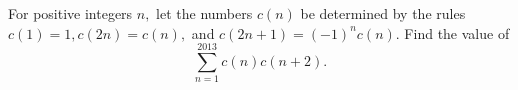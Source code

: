 For positive integers $n,$ let the numbers $c(n)$ be determined by the rules $c(1)=1,c(2n)=c(n),$ and $c(2n+1)=(-1)^nc(n).$ Find the value of \[\sum_{n=1}^{2013}c(n)c(n+2).\]